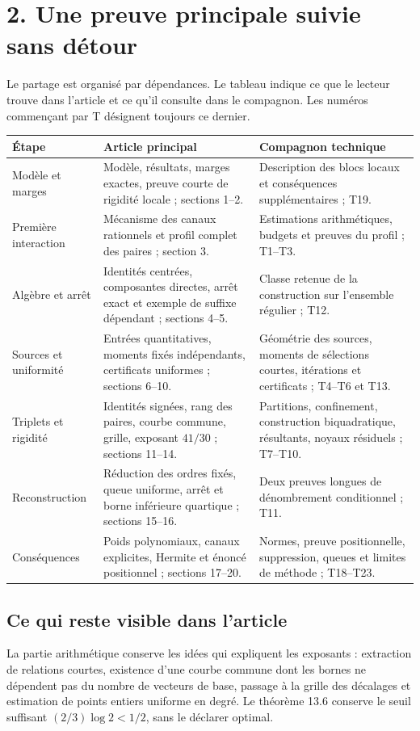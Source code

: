 \documentclass[11pt,a4paper]{article}
\begin{document}
\clearpage
\section*{2. Une preuve principale suivie sans détour}
Le partage est organisé par dépendances. Le tableau indique ce que le
lecteur trouve dans l'article et ce qu'il consulte dans le compagnon.
Les numéros commençant par T désignent toujours ce dernier.

\small
\begin{tabularx}{\textwidth}{@{}>{\raggedright\arraybackslash}p{}>{\raggedright\arraybackslash}X>{\raggedright\arraybackslash}X@{}}
\toprule
Étape & Article principal & Compagnon technique\\
\midrule
Modèle et marges
& Modèle, résultats, marges exactes, preuve courte de rigidité locale ; sections 1--2.
& Description des blocs locaux et conséquences supplémentaires ; T19.\\[4pt]
Première interaction
& Mécanisme des canaux rationnels et profil complet des paires ; section 3.
& Estimations arithmétiques, budgets et preuves du profil ; T1--T3.\\[4pt]
Algèbre et arrêt
& Identités centrées, composantes directes, arrêt exact et exemple de suffixe dépendant ; sections 4--5.
& Classe retenue de la construction sur l'ensemble régulier ; T12.\\[4pt]
Sources et uniformité
& Entrées quantitatives, moments fixés indépendants, certificats uniformes ; sections 6--10.
& Géométrie des sources, moments de sélections courtes, itérations et certificats ; T4--T6 et T13.\\[4pt]
Triplets et rigidité
& Identités signées, rang des paires, courbe commune, grille, exposant \(41/30\) ; sections 11--14.
& Partitions, confinement, construction biquadratique, résultants, noyaux résiduels ; T7--T10.\\[4pt]
Reconstruction
& Réduction des ordres fixés, queue uniforme, arrêt et borne inférieure quartique ; sections 15--16.
& Deux preuves longues de dénombrement conditionnel ; T11.\\[4pt]
Conséquences
& Poids polynomiaux, canaux explicites, Hermite et énoncé positionnel ; sections 17--20.
& Normes, preuve positionnelle, suppression, queues et limites de méthode ; T18--T23.\\
\bottomrule
\end{tabularx}
\normalsize

\subsection*{Ce qui reste visible dans l'article}
La partie arithmétique conserve les idées qui expliquent les exposants :
extraction de relations courtes, existence d'une courbe commune dont les
bornes ne dépendent pas du nombre de vecteurs de base, passage à la grille
des décalages et estimation de points entiers uniforme en degré.
Le théorème 13.6 conserve le seuil suffisant
\((2/3)\log 2<1/2\), sans le déclarer optimal.
\end{document}
